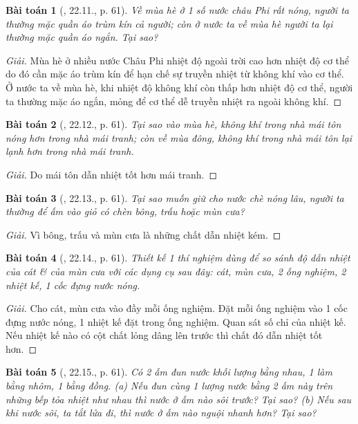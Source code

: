 \documentclass{article}
\newtheorem{baitoan}{Bài toán}
\begin{document}
\begin{baitoan}[\cite{SBT_Vat_Ly_8}, 22.11., p. 61]
	Về mùa hè ở 1 số nước châu Phi rất nóng, người ta thường mặc quần áo trùm kín cả người; còn ở nước ta về mùa hè người ta lại thường mặc quần áo ngắn. Tại sao?
\end{baitoan}

\begin{proof}[Giải]
	Mùa hè ở nhiều nước Châu Phi nhiệt độ ngoài trời cao hơn nhiệt độ cơ thể do đó cần mặc áo trùm kín để hạn chế sự truyền nhiệt từ không khí vào cơ thể. Ở nước ta về mùa hè, khi nhiệt độ không khí còn thấp hơn nhiệt độ cơ thể, người ta thường mặc áo ngắn, mỏng để cơ thể dễ truyền nhiệt ra ngoài không khí.
\end{proof}

\begin{baitoan}[\cite{SBT_Vat_Ly_8}, 22.12., p. 61]
	Tại sao vào mùa hè, không khí trong nhà mái tôn nóng hơn trong nhà mái tranh; còn về mùa đông, không khí trong nhà mái tôn lại lạnh hơn trong nhà mái tranh.
\end{baitoan}

\begin{proof}[Giải]
	Do mái tôn dẫn nhiệt tốt hơn mái tranh.
\end{proof}

\begin{baitoan}[\cite{SBT_Vat_Ly_8}, 22.13., p. 61]
	Tại sao muốn giữ cho nước chè nóng lâu, người ta thường để ấm vào giỏ có chèn bông, trấu hoặc mùn cưa?
\end{baitoan}

\begin{proof}[Giải]
	Vì bông, trấu và mùn cưa là những chất dẫn nhiệt kém.
\end{proof}

\begin{baitoan}[\cite{SBT_Vat_Ly_8}, 22.14., p. 61]
	Thiết kế 1 thí nghiệm dùng để so sánh độ dẫn nhiệt của cát \& của mùn cưa với các dụng cụ sau đây: cát, mùn cưa, 2 ống nghiệm, 2 nhiệt kế, 1 cốc đựng nước nóng.
\end{baitoan}

\begin{proof}[Giải]
	Cho cát, mùn cưa vào đầy mỗi ống nghiệm. Đặt mỗi ống nghiệm vào 1 cốc đựng nước nóng, 1 nhiệt kế đặt trong ống nghiệm. Quan sát số chỉ của nhiệt kế. Nếu nhiệt kế nào có cột chất lỏng dâng lên trước thì chất đó dẫn nhiệt tốt hơn.
\end{proof}

\begin{baitoan}[\cite{SBT_Vat_Ly_8}, 22.15., p. 61]
	Có 2 ấm đun nước khối lượng bằng nhau, 1 làm bằng nhôm, 1 bằng đồng. (a) Nếu đun cùng 1 lượng nước bằng 2 ấm này trên những bếp tỏa nhiệt như nhau thì nước ở ấm nào sôi trước? Tại sao? (b) Nếu sau khi nước sôi, ta tắt lửa đi, thì nước ở ấm nào nguội nhanh hơn? Tại sao?
\end{baitoan}
\end{document}
